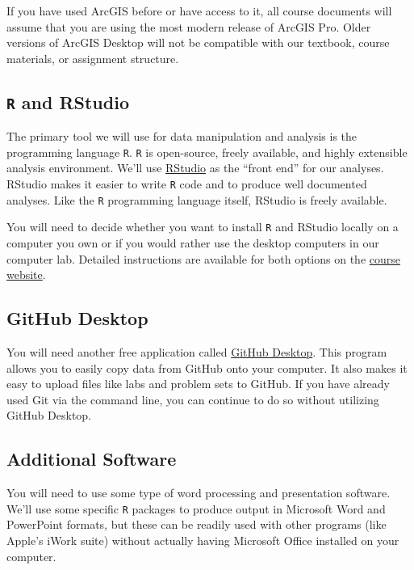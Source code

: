 \documentclass[]{book}
\begin{document}
If you have used ArcGIS before or have access to it, all course documents will assume that you are using the most modern release of ArcGIS Pro. Older versions of ArcGIS Desktop will not be compatible with our textbook, course materials, or assignment structure.

\hypertarget{r-and-rstudio}{%
\subsection{\texorpdfstring{\texttt{R} and RStudio}{R and RStudio}}\label{r-and-rstudio}}

The primary tool we will use for data manipulation and analysis is the programming language \texttt{R}. \texttt{R} is open-source, freely available, and highly extensible analysis environment. We'll use \href{https://www.rstudio.com}{RStudio} as the ``front end'' for our analyses. RStudio makes it easier to write \texttt{R} code and to produce well documented analyses. Like the \texttt{R} programming language itself, RStudio is freely available.

You will need to decide whether you want to install \texttt{R} and RStudio locally on a computer you own or if you would rather use the desktop computers in our computer lab. Detailed instructions are available for both options on the \href{https://slu-soc5650.github.io/docs/course-software/}{course website}.

\hypertarget{github-desktop}{%
\subsection{GitHub Desktop}\label{github-desktop}}

You will need another free application called \href{https://desktop.github.com}{GitHub Desktop}. This program allows you to easily copy data from GitHub onto your computer. It also makes it easy to upload files like labs and problem sets to GitHub. If you have already used Git via the command line, you can continue to do so without utilizing GitHub Desktop.

\hypertarget{additional-software}{%
\subsection{Additional Software}\label{additional-software}}

You will need to use some type of word processing and presentation software. We'll use some specific \texttt{R} packages to produce output in Microsoft Word and PowerPoint formats, but these can be readily used with other programs (like Apple's iWork suite) without actually having Microsoft Office installed on your computer.
\end{document}
